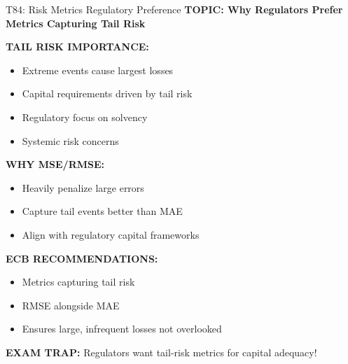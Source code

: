 \documentclass[8pt]{beamer}
\begin{document}
	\begin{frame}{T84: Risk Metrics Regulatory Preference}
		\fontsize{6.5}{7.5}\selectfont
		\textbf{TOPIC: Why Regulators Prefer Metrics Capturing Tail Risk}
		
		\vspace{0.1cm}
		\textbf{TAIL RISK IMPORTANCE:}
		\begin{itemize}
			\item Extreme events cause largest losses
			\item Capital requirements driven by tail risk
			\item Regulatory focus on solvency
			\item Systemic risk concerns
		\end{itemize}
		
		\vspace{0.1cm}
		\textbf{WHY MSE/RMSE:}
		\begin{itemize}
			\item Heavily penalize large errors
			\item Capture tail events better than MAE
			\item Align with regulatory capital frameworks
		\end{itemize}
		
		\vspace{0.1cm}
		\textbf{ECB RECOMMENDATIONS:}
		\begin{itemize}
			\item Metrics capturing tail risk
			\item RMSE alongside MAE
			\item Ensures large, infrequent losses not overlooked
		\end{itemize}
		
		\textcolor{myred}{\textbf{EXAM TRAP:}} Regulators want \textcolor{myblue}{tail-risk metrics} for capital adequacy!
	\end{frame}
	
\end{document}
